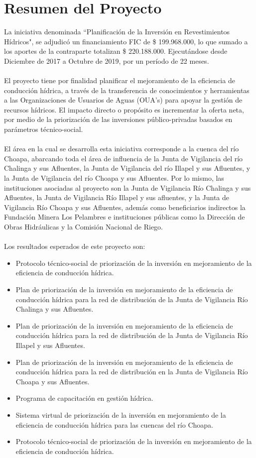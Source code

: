\documentclass[]{article}
\begin{document}
\clearpage

\section{Resumen del Proyecto}

La iniciativa denominada ``Planificación de la Inversión en Revestimientos Hídricos", se adjudicó un financiamiento FIC de \$ 199.968.000, lo que sumado a los aportes de la contraparte totalizan \$ 220.188.000. Ejecutándose desde Diciembre de 2017 a Octubre de 2019, por un período de 22 meses.\\
\\
El proyecto tiene por finalidad planificar el mejoramiento de la eficiencia de conducción hídrica, a través de la transferencia de conocimientos y herramientas a las Organizaciones de Usuarios de Aguas (OUA's) para apoyar la gestión de recursos hídricos. El impacto directo o propósito es incrementar la oferta neta, por medio de la priorización de las inversiones público-privadas basados en parámetros técnico-social.\\
\\
El área en la cual se desarrolla esta iniciativa corresponde a la cuenca del río Choapa, abarcando toda el área de influencia de la Junta de Vigilancia del río Chalinga y sus Afluentes, la Junta de Vigilancia del río Illapel y sus Afluentes, y la Junta de Vigilancia del río Choapa y sus Afluentes. Por lo mismo, las instituciones asociadas al proyecto son la Junta de Vigilancia Río Chalinga y sus Afluentes, la Junta de Vigilancia Río Illapel y sus afluentes, y la Junta de Vigilancia Río Choapa y sus Afluentes, además como beneficiarios indirectos la Fundación Minera Los Pelambres e instituciones públicas como la Dirección de Obras Hidráulicas y la Comisión Nacional de Riego.\\
\\
Los resultados esperados de este proyecto son:
\begin{itemize}
\item Protocolo técnico-social de priorización de la inversión en mejoramiento de la eficiencia de conducción hídrica.
\item Plan de priorización de la inversión en mejoramiento de la eficiencia de conducción hídrica para la red de distribución de la Junta de Vigilancia Río Chalinga y sus Afluentes.
\item Plan de priorización de la inversión en mejoramiento de la eficiencia de conducción hídrica para la red de distribución de la Junta de Vigilancia Río Illapel y sus Afluentes.
\item Plan de priorización de la inversión en mejoramiento de la eficiencia de conducción hídrica para la red de distribución en la Junta de Vigilancia Río Choapa y sus Afluentes.
\item Programa de capacitación en gestión hídrica.
\item Sistema virtual de priorización de la inversión en mejoramiento de la eficiencia de conducción hídrica para las cuencas del río Choapa.
\item Protocolo técnico-social de priorización de la inversión en mejoramiento de la eficiencia de conducción hídrica.
\end{itemize}
\end{document}
